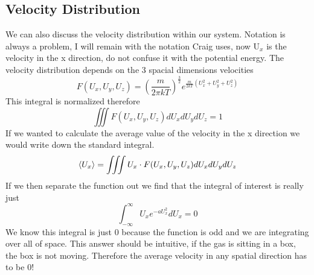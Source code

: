 \documentclass{article}
\begin{document}
\subsection*{Velocity Distribution}
We can also discuss the velocity distribution within our system. 
Notation is always a problem, I will remain with the notation Craig uses, now U$_x$ is the velocity in the x direction, do not confuse it with the potential energy. 
The velocity distribution depends on the 3 spacial dimensions velocities 
\begin{equation}
    F(U_x,U_y,U_z) = \left(\frac{m}{2\pi kT}\right)^{\frac{3}{2}}e^{\frac{m}{2kT}(U_x^2+U_y^2+U_z^2)}
\end{equation}
This integral is normalized therefore 
\begin{equation}
    \iiint F(U_x,U_y,U_z)dU_xdU_ydU_z = 1
\end{equation}
If we wanted to calculate the average value of the velocity in the x direction we would write down the standard integral. 
\begin{equation}
    \braket{U_x} = \iiint U_x \cdot F(U_x,U_y,U_z)dU_xdU_ydU_z
\end{equation}
If we then separate the function out we find that the integral of interest is really just 
\begin{equation}
    \int_{-\infty}^\infty U_x e^{-aU_x^2}dU_x = 0
\end{equation}
We know this integral is just 0 because the function is odd and we are integrating over all of space.
This answer should be intuitive, if the gas is sitting in a box, the box is not moving. 
Therefore the average velocity in any spatial direction has to be 0!
\end{document}
